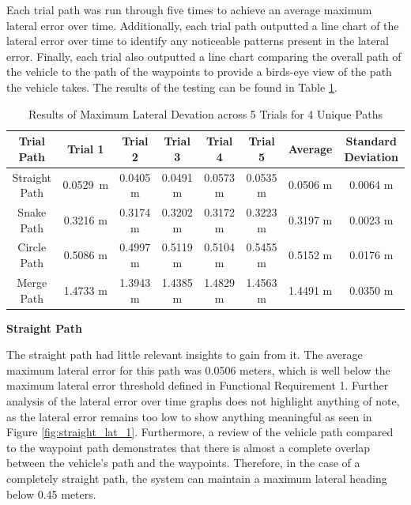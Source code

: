 \documentclass[titlepage, draft]{article}
\begin{document}
{Each trial path was run through five times to achieve an average maximum lateral error over time. Additionally, each trial path outputted a line chart of the lateral error over time to identify any noticeable patterns present in the lateral error. Finally, each trial also outputted a line chart comparing the overall path of the vehicle to the path of the waypoints to provide a birds-eye view of the path the vehicle takes. The results of the testing can be found in Table \ref{tab:overal_eval}. \\

\begin{table}[H]
	\centering
	\begin{tabular}{c c c c c c c c }
		\textbf{Trial Path} & \textbf{Trial 1} & \textbf{Trial 2} & \textbf{Trial 3} & \textbf{Trial 4} & \textbf{Trial 5} & \textbf{Average} & \textbf{Standard Deviation} \\ [0.5ex]
		\hline
		Straight Path       & 0.0529 m         & 0.0405 m         & 0.0491 m         & 0.0573 m         & 0.0535 m         & 0.0506 m         & 0.0064 m                    \\
		\hline
		Snake Path          & 0.3216 m         & 0.3174 m         & 0.3202 m         & 0.3172 m         & 0.3223 m         & 0.3197 m         & 0.0023 m                    \\
		\hline
		Circle Path         & 0.5086 m         & 0.4997 m         & 0.5119 m         & 0.5104 m         & 0.5455 m         & 0.5152 m         & 0.0176 m                    \\
		\hline
		Merge Path          & 1.4733 m         & 1.3943 m         & 1.4385 m         & 1.4829 m         & 1.4563 m         & 1.4491 m         & 0.0350 m                    \\
		\hline
	\end{tabular}
	\caption{Results of Maximum Lateral Devation across 5 Trials for 4 Unique Paths}
	\label{tab:overal_eval}
\end{table}

\textbf{Straight Path}

The straight path had little relevant insights to gain from it. The average maximum lateral error for this path was 0.0506 meters, which is well below the maximum lateral error threshold defined in Functional Requirement 1. Further analysis of the lateral error over time graphs does not highlight anything of note, as the lateral error remains too low to show anything meaningful as seen in Figure \ref{fig:straight_lat_1}. Furthermore, a review of the vehicle path compared to the waypoint path demonstrates that there is almost a complete overlap between the vehicle's path and the waypoints. Therefore, in the case of a completely straight path, the system can maintain a maximum lateral heading below 0.45 meters. \\

}
\end{document}
